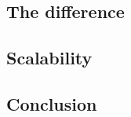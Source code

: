 \documentclass[../../main.tex]{subfiles}
\begin{document}
\subsection*{The difference}


\subsection*{Scalability}


\subsection*{Conclusion}

\end{document}
